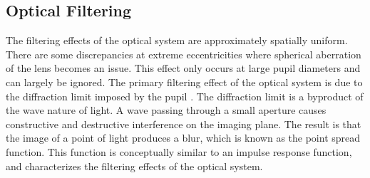 \documentclass{article}
\begin{document}
\subsection{Optical Filtering}
The filtering effects of the optical system are approximately spatially uniform.
There are some discrepancies at extreme eccentricities where spherical aberration of the lens becomes an issue.
This effect only occurs at large pupil diameters and can largely be ignored.
The primary filtering effect of the optical system is due to the diffraction limit imposed by the pupil \cite{Hecht2001}.
The diffraction limit is a byproduct of the wave nature of light.
A wave passing through a small aperture causes constructive and destructive interference on the imaging plane.
The result is that the image of a point of light produces a blur, which is known as the point spread function.
This function is conceptually similar to an impulse response function, and characterizes the filtering effects of the optical system.
\end{document}
